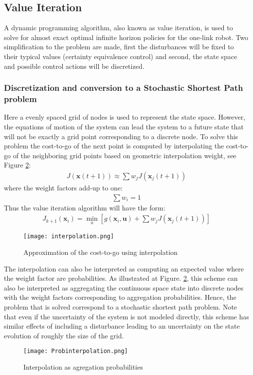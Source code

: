 \subsection{Value Iteration}
\label{sec:VI}

A dynamic programming algorithm, also known as value iteration, is used to solve for almost exact optimal infinite horizon policies for the one-link robot. Two simplification to the problem are made, first the disturbances will be fixed to their typical values (certainty equivalence control) and second, the state space and possible control actions will be discretized.

\subsubsection{Discretization and conversion to a Stochastic Shortest Path problem}
\label{sec:ConvertionToAStocasticShortestPathProblem}

Here a evenly spaced grid of nodes is used to represent the state space. However, the equations of motion of the system can lead the system to a future state that will not be exactly a grid point corresponding to a discrete node. To solve this problem the cost-to-go of the next point is computed by interpolating the cost-to-go of the neighboring grid points based on geometric interpolation weight, see Figure \ref{fig:Probinterpolation}:
%
\begin{align}
	J(\boldsymbol{x}(t+1)) \approx \sum{ w_j J(\boldsymbol{x}_j(t+1)) } 
	\label{eq:interpol}
\end{align}
%
where the weight factors add-up to one:
%
\begin{align}
	 \sum{ w_i  } = 1
	\label{eq:w}
\end{align}
%
Thus the value iteration algorithm will have the form:
%
\begin{align}
	J_{k+1}(\boldsymbol{x}_i) =  \min_u{\left[ g(\boldsymbol{x}_i,\boldsymbol{u}) + \sum{ w_j J(\boldsymbol{x}_j(t+1))}  \right]}
	\label{eq:interpol}
\end{align}
%
\begin{figure}[htp]
	\centering
		\texttt{[image: interpolation.png]}
	\caption{Approximation of the cost-to-go using interpolation}
	\label{fig:interpolation}
\end{figure}
%
The interpolation can also be interpreted as computing an expected value where the weight factor are probabilities. As illustrated at Figure. \ref{fig:Probinterpolation}, this scheme can also be interpreted as aggregating the continuous space state into discrete nodes with the weight factors corresponding to aggregation probabilities. Hence, the problem that is solved correspond to a stochastic shortest path problem. Note that even if the uncertainty of the system is not modeled directly, this scheme has similar effects of including a disturbance leading to an uncertainty on the state evolution of roughly the size of the grid.  
%
\begin{figure}[htp]
	\centering
		\texttt{[image: Probinterpolation.png]}
	\caption{Interpolation as agregation probabilities}
	\label{fig:Probinterpolation}
\end{figure}

